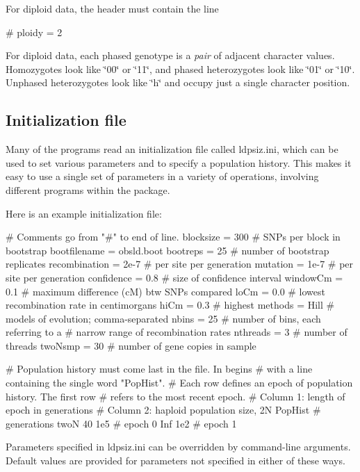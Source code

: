 For diploid data, the header must contain the line \begin{DoxyVerb}# ploidy                = 2
\end{DoxyVerb}


For diploid data, each phased genotype is a {\itshape pair} of adjacent character values. Homozygotes look like \char`\"{}00\char`\"{} or \char`\"{}11\char`\"{}, and phased heterozygotes look like \char`\"{}01\char`\"{} or \char`\"{}10\char`\"{}. Unphased heterozygotes look like \char`\"{}h\char`\"{} and occupy just a single character position.

\subsection*{Initialization file}

Many of the programs read an initialization file called {\ttfamily ldpsiz.\-ini}, which can be used to set various parameters and to specify a population history. This makes it easy to use a single set of parameters in a variety of operations, involving different programs within the package.

Here is an example initialization file\-: \begin{DoxyVerb}# Comments go from "#" to end of line.
blocksize       = 300  # SNPs per block in bootstrap
bootfilename    = obsld.boot
bootreps        = 25   # number of bootstrap replicates
recombination   = 2e-7 # per site per generation
mutation        = 1e-7 # per site per generation
confidence      = 0.8  # size of confidence interval
windowCm        = 0.1  # maximum difference (cM) btw SNPs compared
loCm            = 0.0  # lowest recombination rate in centimorgans
hiCm            = 0.3  # highest
methods         = Hill # models of evolution; comma-separated
nbins           = 25   # number of bins, each referring to a 
                       # narrow range of recombination rates
nthreads        = 3    # number of threads
twoNsmp         = 30   # number of gene copies in sample

# Population history must come last in the file. In begins 
# with a line containing the single word "PopHist".
# Each row defines an epoch of population history. The first row
# refers to the most recent epoch.
# Column 1: length of epoch in generations
# Column 2: haploid population size, 2N
PopHist
# generations twoN
           40  1e5   # epoch 0
          Inf  1e2   # epoch 1
\end{DoxyVerb}


Parameters specified in {\ttfamily ldpsiz.\-ini} can be overridden by command-\/line arguments. Default values are provided for parameters not specified in either of these ways.

